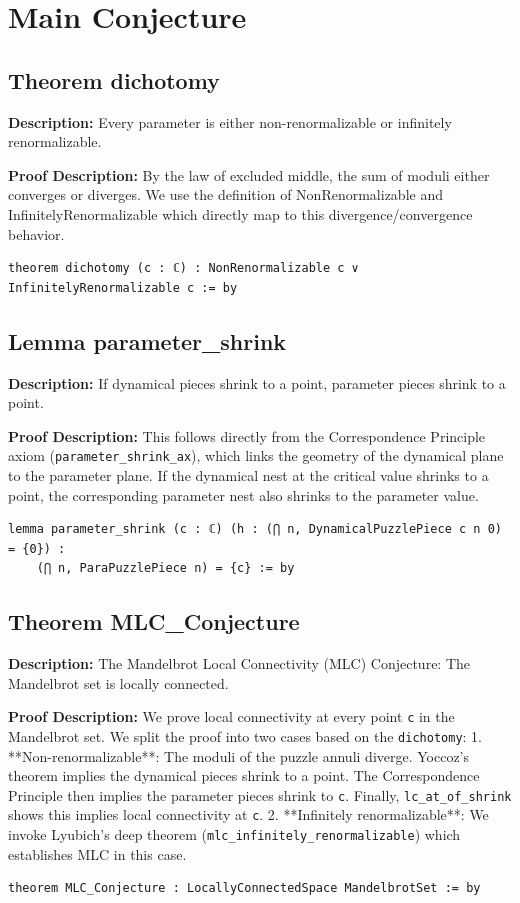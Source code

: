 \section{Main Conjecture}

\subsection*{Theorem dichotomy}
\textbf{Description:} Every parameter is either non-renormalizable or infinitely renormalizable.

\textbf{Proof Description:} By the law of excluded middle, the sum of moduli either converges or diverges.
    We use the definition of NonRenormalizable and InfinitelyRenormalizable which directly
    map to this divergence/convergence behavior.

\begin{lstlisting}[language=Lean]
theorem dichotomy (c : ℂ) : NonRenormalizable c ∨ InfinitelyRenormalizable c := by
\end{lstlisting}

\subsection*{Lemma parameter\_shrink}
\textbf{Description:} If dynamical pieces shrink to a point, parameter pieces shrink to a point.

\textbf{Proof Description:} This follows directly from the Correspondence Principle axiom (\texttt{parameter\_shrink\_ax}),
    which links the geometry of the dynamical plane to the parameter plane.
    If the dynamical nest at the critical value shrinks to a point, the corresponding parameter
    nest also shrinks to the parameter value.

\begin{lstlisting}[language=Lean]
lemma parameter_shrink (c : ℂ) (h : (⋂ n, DynamicalPuzzlePiece c n 0) = {0}) :
    (⋂ n, ParaPuzzlePiece n) = {c} := by
\end{lstlisting}

\subsection*{Theorem MLC\_Conjecture}
\textbf{Description:} The Mandelbrot Local Connectivity (MLC) Conjecture:
    The Mandelbrot set is locally connected.

\textbf{Proof Description:} We prove local connectivity at every point \texttt{c} in the Mandelbrot set.
    We split the proof into two cases based on the \texttt{dichotomy}:
    1.  **Non-renormalizable**: The moduli of the puzzle annuli diverge. Yoccoz's theorem
        implies the dynamical pieces shrink to a point. The Correspondence Principle then
        implies the parameter pieces shrink to \texttt{c}. Finally, \texttt{lc\_at\_of\_shrink} shows this
        implies local connectivity at \texttt{c}.
    2.  **Infinitely renormalizable**: We invoke Lyubich's deep theorem (\texttt{mlc\_infinitely\_renormalizable})
        which establishes MLC in this case.

\begin{lstlisting}[language=Lean]
theorem MLC_Conjecture : LocallyConnectedSpace MandelbrotSet := by
\end{lstlisting}

